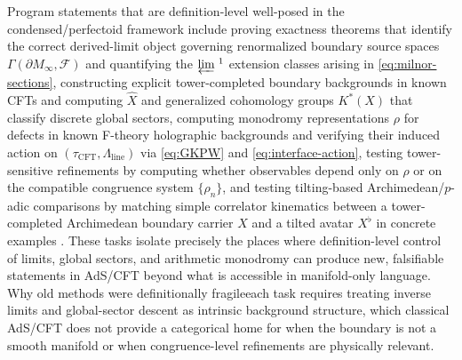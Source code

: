 \documentclass[11pt]{article}
\theoremstyle{remark}
\begin{document}
Program statements that are definition-level well-posed in the condensed/perfectoid framework include proving exactness theorems that identify the correct derived-limit object governing renormalized boundary source spaces \(\Gamma(\partial M_{\infty},\mathcal{F})\) and quantifying the \(\varprojlim{}^{\,1}\) extension classes arising in \eqref{eq:milnor-sections}, constructing explicit tower-completed boundary backgrounds in known CFTs and computing \(\widehat{X}\) and generalized cohomology groups \(K^{*}(X)\) that classify discrete global sectors, computing monodromy representations \(\rho\) for defects in known F-theory holographic backgrounds and verifying their induced action on \((\tau_{\mathrm{CFT}},\Lambda_{\mathrm{line}})\) via \eqref{eq:GKPW} and \eqref{eq:interface-action}, testing tower-sensitive refinements by computing whether observables depend only on \(\rho\) or on the compatible congruence system \(\{\rho_n\}\), and testing tilting-based Archimedean/\(p\)-adic comparisons by matching simple correlator kinematics between a tower-completed Archimedean boundary carrier \(X\) and a tilted avatar \(X^{\flat}\) in concrete examples \cite{Gubser2017, Heydeman2018}. These tasks isolate precisely the places where definition-level control of limits, global sectors, and arithmetic monodromy can produce new, falsifiable statements in AdS/CFT beyond what is accessible in manifold-only language. Why old methods were definitionally fragile\:each task requires treating inverse limits and global-sector descent as intrinsic background structure, which classical AdS/CFT does not provide a categorical home for when the boundary is not a smooth manifold or when congruence-level refinements are physically relevant.
\end{document}
